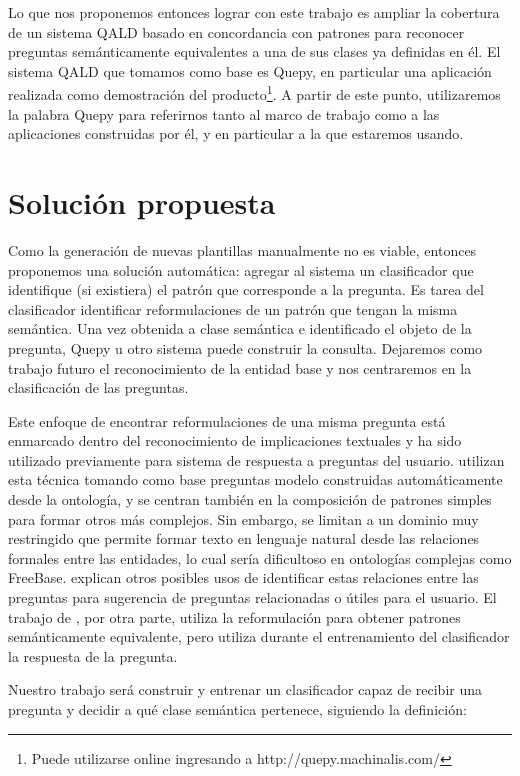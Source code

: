 Lo que nos proponemos entonces lograr con este trabajo es ampliar la cobertura de un sistema QALD basado en concordancia con patrones para reconocer preguntas semánticamente equivalentes a una de sus clases ya definidas en él. El sistema QALD que tomamos como base es Quepy, en particular una aplicación realizada como demostración del producto\footnote{Puede utilizarse online ingresando a http://quepy.machinalis.com/}. A partir de este punto, utilizaremos la palabra Quepy para referirnos tanto al marco de trabajo como a las aplicaciones construidas por él, y en particular a la que estaremos usando.

\section{Solución propuesta}

Como la generación de nuevas plantillas manualmente no es viable, entonces proponemos una solución automática: agregar al sistema un clasificador que identifique (si existiera) el patrón que corresponde a la pregunta. Es tarea del clasificador identificar reformulaciones de un patrón que tengan la misma semántica. Una vez obtenida a clase semántica e identificado el objeto de la pregunta, Quepy u otro sistema puede construir la consulta. Dejaremos como trabajo futuro el reconocimiento de la entidad base y nos centraremos en la clasificación de las preguntas.

Este enfoque de encontrar reformulaciones de una misma pregunta está enmarcado dentro del reconocimiento de implicaciones textuales y ha sido utilizado previamente para sistema de respuesta a preguntas del usuario. \citet{ou_entailement} utilizan esta técnica tomando como base preguntas modelo construidas automáticamente desde la ontología, y se centran también en la composición de patrones simples para formar otros más complejos. Sin embargo, se limitan a un dominio muy restringido que permite formar texto en lenguaje natural desde las relaciones formales entre las entidades, lo cual sería dificultoso en ontologías complejas como FreeBase. \citet{rui_relations} explican otros posibles usos de identificar estas relaciones entre las preguntas para sugerencia de preguntas relacionadas o útiles para el usuario. El trabajo de \citet{Kosseimmuyparecido}, por otra parte, utiliza la reformulación para obtener patrones semánticamente equivalente, pero utiliza durante el entrenamiento del clasificador la respuesta de la pregunta.

Nuestro trabajo será construir y entrenar un clasificador capaz de recibir una pregunta y decidir a qué clase semántica pertenece, siguiendo la definición:

